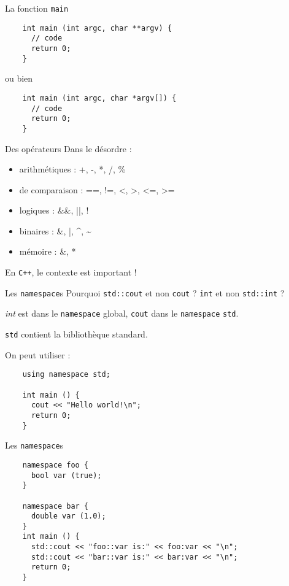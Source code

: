 \begin{frame}[fragile]{La fonction \texttt{main}}
  \begin{lstlisting}
    int main (int argc, char **argv) {
      // code
      return 0;
    }
  \end{lstlisting}
 ou bien
  \begin{lstlisting}
    int main (int argc, char *argv[]) {
      // code
      return 0;
    }
  \end{lstlisting}
\end{frame}

\begin{frame}{Des opérateurs}
  Dans le désordre :
  \begin{itemize}
  \item arithmétiques : +, -, *, /, \%
  \item de comparaison : ==, !=, <, >, <=, >=
  \item logiques : \&\&, ||, !
  \item binaires : \&, |, \^{}, \~{}
  \item mémoire : \&, *
  \end{itemize}

  En \texttt{C++}, le contexte est important !
\end{frame}

\begin{frame}[fragile]{Les \texttt{namespace}s}
  Pourquoi \texttt{std::cout} et non \texttt{cout} ? \texttt{int} et non \texttt{std::int} ?
  
  \textit{int} est dans le \texttt{namespace} global, \texttt{cout} dans le \texttt{namespace} \texttt{std}.
  
  \texttt{std} contient la bibliothèque standard.

  On peut utiliser :
  \begin{lstlisting}
    using namespace std;
    
    int main () {
      cout << "Hello world!\n";
      return 0;
    }
  \end{lstlisting}
\end{frame}

\begin{frame}[fragile]{Les \texttt{namespace}s}
  \begin{lstlisting}
    namespace foo {
      bool var (true);
    }

    namespace bar {
      double var (1.0);
    }
    int main () {
      std::cout << "foo::var is:" << foo:var << "\n";
      std::cout << "bar::var is:" << bar:var << "\n";
      return 0;
    }
  \end{lstlisting}
\end{frame}
